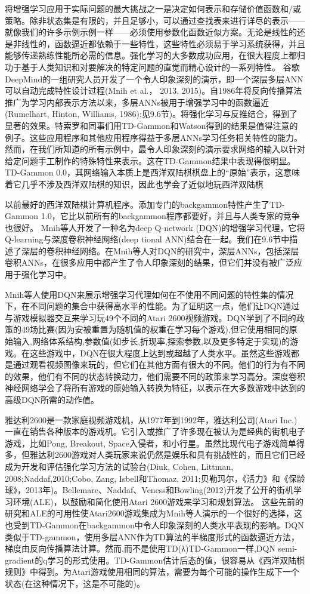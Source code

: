将增强学习应用于实际问题的最大挑战之一是决定如何表示和存储价值函数和/或策略。除非状态集是有限的，并且足够小，可以通过查找表来进行详尽的表示——就像我们的许多示例示例一样——必须使用参数化函数近似方案。无论是线性的还是非线性的，函数逼近都依赖于一些特性，这些特性必须易于学习系统获得，并且能够传递熟练性能所必需的信息。强化学习的大多数成功应用，在很大程度上都归功于基于人类知识和对要解决的特定问题的直觉而精心设计的一系列特性。
谷歌DeepMind的一组研究人员开发了一个令人印象深刻的演示，即一个深层多层ANN可以自动完成特性设计过程(Mnih et al.， 2013, 2015)。自1986年将反向传播算法推广为学习内部表示方法以来，多层ANNs被用于增强学习中的函数逼近(Rumelhart, Hinton, Williams, 1986);见9.6节)。将强化学习与反推结合，得到了显著的效果。特索罗和同事们用TD-Gammon和Watson得到的结果是值得注意的例子。这些应用程序和其他应用程序得益于多层ANNs学习任务相关特性的能力。然而，在我们所知道的所有示例中，最令人印象深刻的演示要求网络的输入以针对给定问题手工制作的特殊特性来表示。这在TD-Gammon结果中表现得很明显。TD-Gammon 0.0，其网络输入本质上是西洋双陆棋棋盘上的“原始”表示，这意味着它几乎不涉及西洋双陆棋的知识，因此也学会了近似地玩西洋双陆棋

以前最好的西洋双陆棋计算机程序。添加专门的backgammon特性产生了TD-Gammon 1.0，它比以前所有的backgammon程序都要好，并且与人类专家的竞争也很好。
Mnih等人开发了一种名为deep Q-network (DQN)的增强学习代理，它将Q-learning与深度卷积神经网络(deep tional ANN)结合在一起。我们在9.6节中描述了深层的卷积神经网络。在Mnih等人对DQN的研究中，深层ANNs，包括深层卷积ANNs，在很多应用中都产生了令人印象深刻的结果，但它们并没有被广泛应用于强化学习中。

Mnih等人使用DQN来展示增强学习代理如何在不使用不同问题的特性集的情况下，在不同问题的集合中获得高水平的性能。为了证明这一点，他们让DQN通过与游戏模拟器交互来学习玩49个不同的Atari 2600视频游戏。DQN学到了不同的政策的49场比赛(因为安被重置为随机值的权重在学习每个游戏),但它使用相同的原始输入,网络体系结构,参数值(如步长,折现率,探索参数,以及更多特定于实现)的游戏。在这些游戏中，DQN在很大程度上达到或超越了人类水平。虽然这些游戏都是通过观看视频图像来玩的，但它们在其他方面有很大的不同。他们的行为有不同的效果，他们有不同的状态转换动力，他们需要不同的政策来学习高分。深度卷积神经网络学会了将所有游戏的原始输入转换为特征，以表示在大多数游戏中达到的高级DQN所需的动作值。

雅达利2600是一款家庭视频游戏机，从1977年到1992年，雅达利公司(Atari Inc.)一直在销售各种版本的游戏机。它引入或推广了许多现在被认为是经典的街机电子游戏，比如Pong, Breakout, Space入侵者，和小行星。虽然比现代电子游戏简单得多，但雅达利2600游戏对人类玩家来说仍然是娱乐和具有挑战性的，而且它们已经成为开发和评估强化学习方法的试验台(Diuk, Cohen, Littman, 2008;Naddaf,2010;Cobo, Zang, Isbell和Thomaz, 2011;贝勒玛尔，《活力》和《保龄球》，2013年)。Bellemare、Naddaf、Veness和Bowling(2012)开发了公开的街机学习环境(ALE)，以鼓励和简化使用Atari 2600游戏来学习和规划算法。
这些先前的研究和ALE的可用性使Atari2600游戏集成为Mnih等人演示的一个很好的选择，这也受到TD-Gammon在backgammon中令人印象深刻的人类水平表现的影响。DQN类似于TD-gammon，使用多层ANN作为TD算法的半梯度形式的函数逼近方法，梯度由反向传播算法计算。然而,而不是使用TD(λ)TD-Gammon一样,DQN semi-gradient的q学习的形式使用。TD-Gammon估计后态的值，很容易从《西洋双陆棋规则》中得到。为Atari游戏使用相同的算法，需要为每个可能的操作生成下一个状态(在这种情况下，这是不可能的)。

